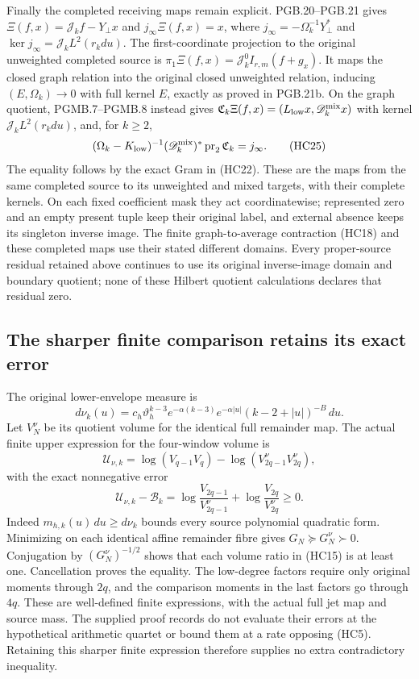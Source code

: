 Finally the completed receiving maps remain explicit. PGB.20--PGB.21
gives $\Xi(f,x)=\mathscr J_k f-Y_\perp x$ and
$j_\infty\Xi(f,x)=x$, where
$j_\infty=-\Omega_k^{-1}Y_\perp^*$ and
$\ker j_\infty=\mathscr J_kL^2(r_kdu)$.
The first-coordinate projection to the original unweighted
completed source is
$\pi_1\Xi(f,x)=\mathscr J_k^0 I_{r,m}(f+g_x)$.
It maps the closed graph relation into the original closed
unweighted relation, inducing $(E,\Omega_k)\to0$ with full
kernel $E$, exactly as proved in PGB.21b. On the graph quotient,
PGMB.7--PGMB.8 instead gives
$\mathfrak C_k\Xi(f,x)=(L_{\rm low}x,\mathscr D_k^{\rm mix}x)$
with kernel $\mathscr J_kL^2(r_kdu)$, and, for $k\geq2$,
\[
 (\Omega_k-K_{\rm low})^{-1}
          (\mathscr D_k^{\rm mix})^*\operatorname{pr}_2
                        \mathfrak C_k=j_\infty.
 \tag{HC25}
\]
The equality follows by the exact Gram in (HC22).
These are the maps from the same completed source to its
unweighted and mixed targets, with their complete kernels.
On each fixed coefficient mask they act coordinatewise;
represented zero and an empty present tuple keep their
original label, and external absence keeps its singleton
inverse image. The finite graph-to-average contraction
(HC18) and these completed maps use their stated different
domains. Every proper-source residual retained above
continues to use its original inverse-image domain and
boundary quotient; none of these Hilbert quotient calculations
declares that residual zero.


\subsection{The sharper finite comparison retains its exact error}

The original lower-envelope measure is
\[
 d\nu_k(u)=c_h\vartheta_h^{k-3}e^{-\alpha(k-3)}
 e^{-\alpha|u|}(k-2+|u|)^{-B}\,du.
\]
Let $V_N^\nu$ be its quotient volume for the identical full remainder
map.  The actual finite upper expression for the four-window volume is
\[
 \mathcal U_{\nu,k}=\log(V_{q-1}V_q)
                  -\log(V_{2q-1}^\nu V_{2q}^\nu),
\]
with the exact nonnegative error
\[
 \boxed{
 \mathcal U_{\nu,k}-\mathcal B_k
 =\log\frac{V_{2q-1}}{V_{2q-1}^\nu}
  +\log\frac{V_{2q}}{V_{2q}^\nu}\geq0.}\tag{HC15}
\]
Indeed $m_{h,k}(u)\,du\geq d\nu_k$ bounds every source polynomial
quadratic form.  Minimizing on each identical affine remainder fibre
gives $G_N\succeq G_N^\nu\succ0$.  Conjugation by
$(G_N^\nu)^{-1/2}$ shows that each volume ratio in (HC15) is at least
one.  Cancellation proves the equality.  The low-degree factors require
only original moments through $2q$, and the comparison moments in the
last factors go through $4q$.  These are well-defined finite expressions,
with the actual full jet map and source mass.  The supplied proof
records do not evaluate their errors at the hypothetical arithmetic
quartet or bound them at a rate opposing (HC5).  Retaining this sharper
finite expression therefore supplies no extra contradictory inequality.
